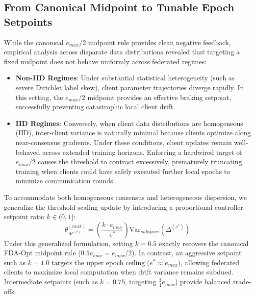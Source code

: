 \subsection{From Canonical Midpoint to Tunable Epoch Setpoints}
\label{subsec:tunable_setpoints}
While the canonical $e_{max}/2$ midpoint rule provides clean negative feedback, empirical analysis across disparate data distributions revealed that targeting a fixed midpoint does not behave uniformly across federated regimes:
\begin{itemize}
    \item \textbf{Non-IID Regimes}: Under substantial statistical heterogeneity (such as severe Dirichlet label skew), client parameter trajectories diverge rapidly. In this setting, the $e_{max}/2$ midpoint provides an effective braking setpoint, successfully preventing catastrophic local client drift.
    \item \textbf{IID Regimes}: Conversely, when client data distributions are homogeneous (IID), inter-client variance is naturally minimal because clients optimize along near-consensus gradients. Under these conditions, client updates remain well-behaved across extended training horizons. Enforcing a hardwired target of $e_{max}/2$ causes the threshold to contract excessively, prematurely truncating training when clients could have safely executed further local epochs to minimize communication rounds.
\end{itemize}
To accommodate both homogeneous consensus and heterogeneous dispersion, we generalize the threshold scaling update by introducing a proportional controller setpoint ratio $k \in (0, 1]$:
\begin{equation}
    \theta_{\mathcal{M}^{(r)}}^{(next)} = \left( \frac{k \cdot e_{max}}{e^*} \right) \text{Var}_{subspace}(\Delta^{(e^*)})
    \label{eq:generalized_update}
\end{equation}
Under this generalized formulation, setting $k = 0.5$ exactly recovers the canonical FDA-Opt midpoint rule ($0.5 e_{max} = e_{max}/2$). In contrast, an aggressive setpoint such as $k = 1.0$ targets the upper epoch ceiling ($e^* \approx e_{max}$), allowing federated clients to maximize local computation when drift variance remains subdued. Intermediate setpoints (such as $k = 0.75$, targeting $\frac{3}{4}e_{max}$) provide balanced trade-offs. 

